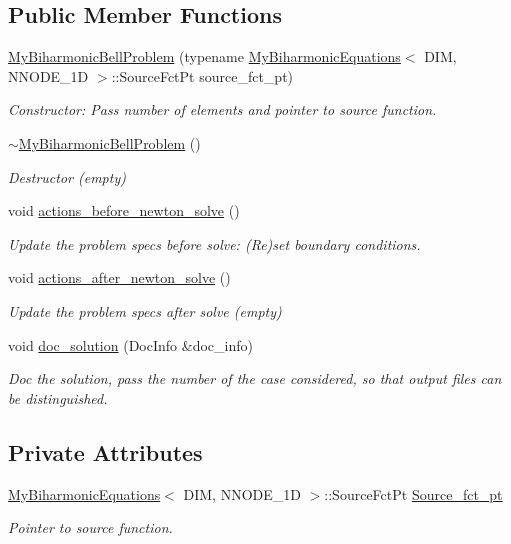 \subsection*{Public Member Functions}
\begin{DoxyCompactItemize}
\item 
\hyperlink{classMyBiharmonicBellProblem_a61b5ab7db1511188dd7ca00e01179dda}{My\+Biharmonic\+Bell\+Problem} (typename \hyperlink{classoomph_1_1MyBiharmonicEquations}{My\+Biharmonic\+Equations}$<$ D\+IM, N\+N\+O\+D\+E\+\_\+1D $>$\+::Source\+Fct\+Pt source\+\_\+fct\+\_\+pt)
\begin{DoxyCompactList}\small\item\em Constructor\+: Pass number of elements and pointer to source function. \end{DoxyCompactList}\item 
\hyperlink{classMyBiharmonicBellProblem_aa81548287a36375d4e3841cf3d71489b}{$\sim$\+My\+Biharmonic\+Bell\+Problem} ()
\begin{DoxyCompactList}\small\item\em Destructor (empty) \end{DoxyCompactList}\item 
void \hyperlink{classMyBiharmonicBellProblem_acdbf06c4f8cf70ee89cd8f1002da98e8}{actions\+\_\+before\+\_\+newton\+\_\+solve} ()
\begin{DoxyCompactList}\small\item\em Update the problem specs before solve\+: (Re)set boundary conditions. \end{DoxyCompactList}\item 
void \hyperlink{classMyBiharmonicBellProblem_afbe1effa8e47ff655f99d8ec869eaa2f}{actions\+\_\+after\+\_\+newton\+\_\+solve} ()
\begin{DoxyCompactList}\small\item\em Update the problem specs after solve (empty) \end{DoxyCompactList}\item 
void \hyperlink{classMyBiharmonicBellProblem_ae361099fb498e9965ea37a648ce71032}{doc\+\_\+solution} (Doc\+Info \&doc\+\_\+info)
\begin{DoxyCompactList}\small\item\em Doc the solution, pass the number of the case considered, so that output files can be distinguished. \end{DoxyCompactList}\end{DoxyCompactItemize}
\subsection*{Private Attributes}
\begin{DoxyCompactItemize}
\item 
\hyperlink{classoomph_1_1MyBiharmonicEquations}{My\+Biharmonic\+Equations}$<$ D\+IM, N\+N\+O\+D\+E\+\_\+1D $>$\+::Source\+Fct\+Pt \hyperlink{classMyBiharmonicBellProblem_ac67539e5f625b52f2da8055599e2c72d}{Source\+\_\+fct\+\_\+pt}
\begin{DoxyCompactList}\small\item\em Pointer to source function. \end{DoxyCompactList}\end{DoxyCompactItemize}


